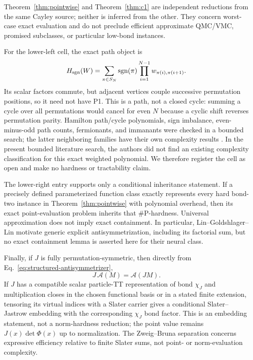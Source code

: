 \documentclass[aps,pra,reprint,superscriptaddress,nofootinbib,longbibliography,showkeys]{revtex4-2}
\theoremstyle{definition}
\begin{document}
Theorem~\ref{thm:pointwise} and Theorem~\ref{thm:c1} are independent reductions
from the same Cayley source; neither is inferred from the other.  They concern
worst-case exact evaluation and do not preclude efficient approximate QMC/VMC,
promised subclasses, or particular low-bond instances.

For the lower-left cell, the exact path object is
\begin{equation}
 H_{\rm sgn}(W)=\sum_{\pi\in S_N}\operatorname{sgn}(\pi)
 \prod_{i=1}^{N-1}w_{\pi(i),\pi(i+1)}.
 \label{eq:signed-path}
\end{equation}
Its scalar factors commute, but adjacent vertices couple successive
permutation positions, so it need not have P1.  This is a path, not a closed
cycle: summing a cycle over all permutations would cancel for even $N$ because
a cyclic shift reverses permutation parity.  Hamilton path/cycle polynomials,
sign imbalance, even-minus-odd path counts, fermionants, and immanants were
checked in a bounded search; the latter neighboring families have their own
complexity results \cite{MertensMoore2013Fermionant}.  In the present bounded
literature search, the authors did not find an existing complexity
classification for this exact weighted polynomial.  We therefore register
the cell as open and make no hardness or tractability claim.

The lower-right entry supports only a conditional inheritance statement.  If
a precisely defined parameterized function class exactly represents every
hard bond-two instance in Theorem~\ref{thm:pointwise} with polynomial overhead,
then its exact point-evaluation problem inherits that \#P-hardness.  Universal
approximation does not imply exact containment.  In particular,
Lin--Goldshlager--Lin motivate generic explicit antisymmetrization, including
its factorial sum, but no exact containment lemma is asserted here for their
neural class.

Finally, if $J$ is fully permutation-symmetric, then directly from
Eq.~\eqref{eq:structured-antisymmetrizer},
\begin{equation}
 J\,\mathcal A(M)=\mathcal A(JM).
 \label{eq:jastrow-commutes}
\end{equation}
If $J$ has a compatible scalar particle-TT representation of bond $\chi_J$
and multiplication closes in the chosen functional basis or in a stated
finite extension, tensoring its virtual indices with a Slater carrier gives a
conditional Slater--Jastrow embedding with the corresponding $\chi_J$ bond
factor.  This is an embedding statement, not a norm-hardness reduction; the
point value remains $J(x)\det\Phi(x)$ up to normalization.  The
Zweig--Bruna separation concerns expressive efficiency relative to finite
Slater sums, not point- or norm-evaluation complexity.
\end{document}
